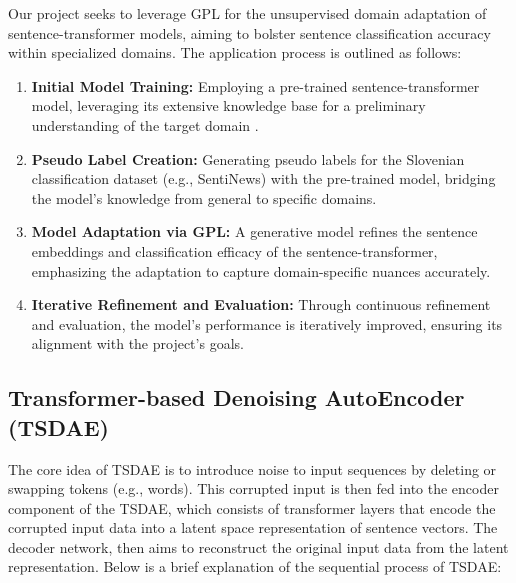 \documentclass[fleqn,moreauthors,10pt]{ds_report}
\begin{document}
Our project seeks to leverage GPL for the unsupervised domain adaptation of sentence-transformer models, aiming to bolster sentence classification accuracy within specialized domains. The application process is outlined as follows:
\begin{enumerate}
    \item \textbf{Initial Model Training:} Employing a pre-trained sent\-ence-transformer model, leveraging its extensive knowledge base for a preliminary understanding of the target domain \cite{reimers2019sentence}.
    
    \item \textbf{Pseudo Label Creation:} Generating pseudo labels for the Slovenian classification dataset (e.g., SentiNews) with the pre-trained model, bridging the model's knowledge from general to specific domains.
    
    \item \textbf{Model Adaptation via GPL:} A generative model refines the sentence embeddings and classification efficacy of the sentence-transformer, emphasizing the adaptation to capture domain-specific nuances accurately.
    
    \item \textbf{Iterative Refinement and Evaluation:} Through continuous refinement and evaluation, the model's performance is iteratively improved, ensuring its alignment with the project's goals.
\end{enumerate}



\subsection*{Transformer-based Denoising AutoEncoder (TSDAE)}

The core idea of TSDAE \cite{tsdae} is to introduce noise to input sequences by deleting or swapping tokens (e.g., words). 
This corrupted input is then fed into the encoder component of the TSDAE, which consists of transformer layers that encode the corrupted input data into a latent space representation of sentence vectors. 
The decoder network, then aims to reconstruct the original input data from the latent representation.
Below is a brief explanation of the sequential process of TSDAE:
\end{document}
